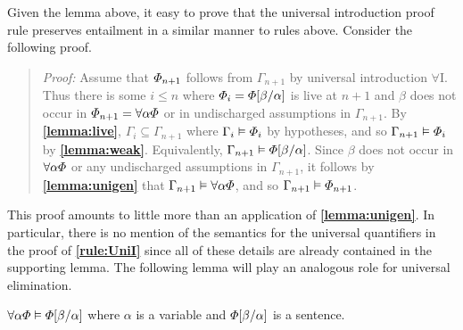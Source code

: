Given the lemma above, it easy to prove that the universal introduction proof rule preserves entailment in a similar manner to rules above.
Consider the following proof.





\begin{quote} 
  \textit{Proof:} Assume that $\varPhi_{n+1}$ follows from $\Gamma_{n+1}$ by universal introduction $\forall$I.
  Thus there is some $i\leq n$ where $\varPhi_i=\varPhi[\beta/\alpha]$ is live at $n+1$ and $\beta$ does not occur in $\varPhi_{n+1}=\forall \alpha\varPhi$ or in undischarged assumptions in $\Gamma_{n+1}$.
  By \textbf{\ref{lemma:live}}, $\Gamma_i\subseteq \Gamma_{n+1}$ where $\Gamma_i\vDash\varPhi_i$ by hypotheses, and so $\Gamma_{n+1} \vDash \varPhi_i$ by \textbf{\ref{lemma:weak}}.
  Equivalently, $\Gamma_{n+1} \vDash \varPhi[\beta/\alpha]$.
  Since $\beta$ does not occur in $\forall \alpha\varPhi$ or any undischarged assumptions in $\Gamma_{n+1}$, it follows by \textbf{\ref{lemma:unigen}} that $\Gamma_{n+1}\vDash \forall \alpha\varPhi$, and so $\Gamma_{n+1}\vDash\varPhi_{n+1}$.
\end{quote}

This proof amounts to little more than an application of \textbf{\ref{lemma:unigen}}.
In particular, there is no mention of the semantics for the universal quantifiers in the proof of \textbf{\ref{rule:UniI}} since all of these details are already contained in the supporting lemma.
The following lemma will play an analogous role for universal elimination.



\begin{Lthm} \label{lemma:uniinst}
  $\forall\alpha\varPhi \vDash \varPhi[\beta/\alpha]$ where $\alpha$ is a variable and $\varPhi[\beta/\alpha]$ is a sentence. 
\end{Lthm}

